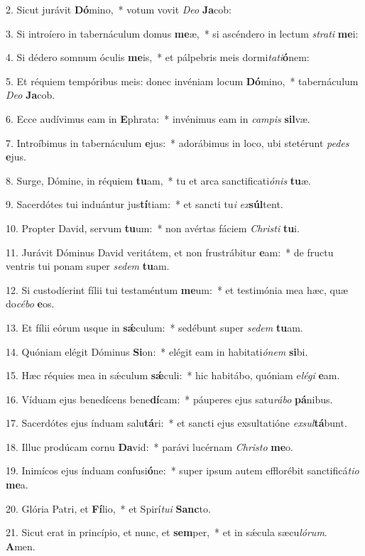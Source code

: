 2. Sicut jurávit \textbf{Dó}mino,~*  votum vovit \textit{De}\textit{o} \textbf{Ja}cob:\

3. Si introíero in tabernáculum domus \textbf{me}æ,~*  si ascéndero in lectum \textit{stra}\textit{ti} \textbf{me}i:\

4. Si dédero somnum óculis \textbf{me}is,~*  et pálpebris meis dormi\textit{ta}\textit{ti}\textbf{ó}nem:\

5. Et réquiem tempóribus meis: donec invéniam locum \textbf{Dó}mino,~*  tabernáculum \textit{De}\textit{o} \textbf{Ja}cob.\

6. Ecce audívimus eam in \textbf{E}phrata:~*  invénimus eam in \textit{cam}\textit{pis} \textbf{sil}væ.\

7. Introíbimus in tabernáculum \textbf{e}jus:~*  adorábimus in loco, ubi stetérunt \textit{pe}\textit{des} \textbf{e}jus.\

8. Surge, Dómine, in réquiem \textbf{tu}am,~*  tu et arca sanctificati\textit{ó}\textit{nis} \textbf{tu}æ.\

9. Sacerdótes tui induántur jus\textbf{tí}tiam:~*  et sancti tu\textit{i} \textit{ex}\textbf{súl}tent.\

10. Propter David, servum \textbf{tu}um:~*  non avértas fáciem \textit{Chris}\textit{ti} \textbf{tu}i.\

11. Jurávit Dóminus David veritátem, et non frustrábitur \textbf{e}am:~*  de fructu ventris tui ponam super \textit{se}\textit{dem} \textbf{tu}am.\

12. Si custodíerint fílii tui testaméntum \textbf{me}um:~*  et testimónia mea hæc, quæ do\textit{cé}\textit{bo} \textbf{e}os.\

13. Et fílii eórum usque in \textbf{sǽ}culum:~*  sedébunt super \textit{se}\textit{dem} \textbf{tu}am.\

14. Quóniam elégit Dóminus \textbf{Si}on:~*  elégit eam in habitati\textit{ó}\textit{nem} \textbf{si}bi.\

15. Hæc réquies mea in sǽculum \textbf{sǽ}culi:~*  hic habitábo, quóniam e\textit{lé}\textit{gi} \textbf{e}am.\

16. Víduam ejus benedícens bene\textbf{dí}cam:~*  páuperes ejus satu\textit{rá}\textit{bo} \textbf{pá}nibus.\

17. Sacerdótes ejus índuam salu\textbf{tá}ri:~*  et sancti ejus exsultatióne \textit{ex}\textit{sul}\textbf{tá}bunt.\

18. Illuc prodúcam cornu \textbf{Da}vid:~*  parávi lucérnam \textit{Chris}\textit{to} \textbf{me}o.\

19. Inimícos ejus índuam confusi\textbf{ó}ne:~*  super ipsum autem efflorébit sanctificá\textit{ti}\textit{o} \textbf{me}a.\

20. Glória Patri, et \textbf{Fí}lio,~*  et Spirí\textit{tu}\textit{i} \textbf{Sanc}to.\

21. Sicut erat in princípio, et nunc, et \textbf{sem}per,~*  et in sǽcula sæcu\textit{ló}\textit{rum}. \textbf{A}men.\


